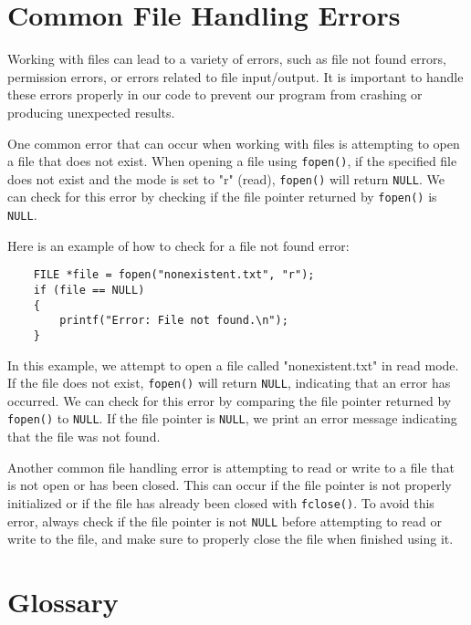 \section{Common File Handling Errors}

Working with files can lead to a variety of errors, such as file not found errors, permission errors, or errors related to file input/output. It is important to handle these errors properly in our code to prevent our program from crashing or producing unexpected results.

One common error that can occur when working with files is attempting to open a file that does not exist. When opening a file using {\tt fopen()}, if the specified file does not exist and the mode is set to "r" (read), {\tt fopen()} will return {\tt NULL}. We can check for this error by checking if the file pointer returned by {\tt fopen()} is {\tt NULL}.

Here is an example of how to check for a file not found error:

\begin{verbatim}
	FILE *file = fopen("nonexistent.txt", "r");
	if (file == NULL)
	{
		printf("Error: File not found.\n");
	}
\end{verbatim}

In this example, we attempt to open a file called "nonexistent.txt" in read mode. If the file does not exist, {\tt fopen()} will return {\tt NULL}, indicating that an error has occurred. We can check for this error by comparing the file pointer returned by {\tt fopen()} to {\tt NULL}. If the file pointer is {\tt NULL}, we print an error message indicating that the file was not found.

Another common file handling error is attempting to read or write to a file that is not open or has been closed. This can occur if the file pointer is not properly initialized or if the file has already been closed with {\tt fclose()}. To avoid this error, always check if the file pointer is not {\tt NULL} before attempting to read or write to the file, and make sure to properly close the file when finished using it.

\section{Glossary}

